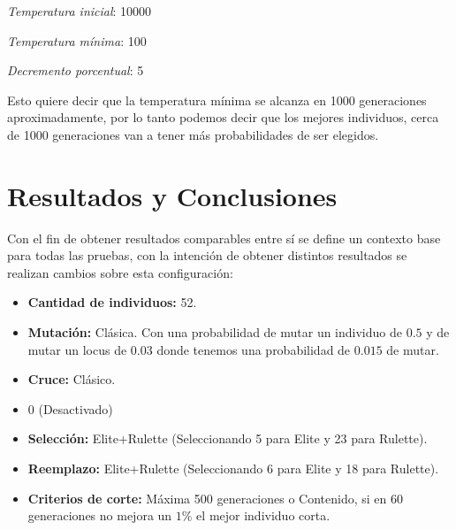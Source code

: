 \documentclass{sig-alternate}
\begin{document}
			\begin{enumeration}			
				\item \textit{Temperatura inicial}: 10000
				\item \textit{Temperatura mínima}: 100
				\item \textit{Decremento porcentual}: 5
			\end{enumeration}

			Esto quiere decir que la temperatura mínima se alcanza en 1000 generaciones aproximadamente, por lo tanto podemos decir que los mejores individuos, cerca de 1000 generaciones van a tener más probabilidades de ser elegidos.
	
	\section{Resultados y Conclusiones}

	Con el fin de obtener resultados comparables entre sí se define un
	contexto base para todas las pruebas, con la intención de obtener distintos 
	resultados se realizan cambios sobre esta configuración:
	
	\begin{itemize}
		\item \textbf{Cantidad de individuos:} 52.
		\item \textbf{Mutación:} Clásica. Con una probabilidad de mutar un individuo de $0.5$ 
		y de mutar un locus de $0.03$ donde tenemos una probabilidad de $0.015$ de mutar.
		\item \textbf{Cruce:} Clásico.
		\item {} 0 (Desactivado)
		\item \textbf{Selección:} Elite+Rulette (Seleccionando 5 para Elite y 23 para Rulette).
		\item \textbf{Reemplazo:} Elite+Rulette (Seleccionando 6 para Elite y 18 para Rulette).
		\item \textbf{Criterios de corte:} Máxima 500 generaciones o Contenido, si en 60 generaciones
		no mejora un $1\%$ el mejor individuo corta.
	\end{itemize}

	

\end{document}
